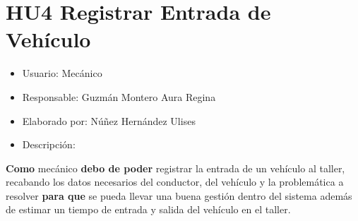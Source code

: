 \section{HU4 Registrar Entrada de Vehículo}
\begin{itemize}
	\item Usuario: Mecánico
	\item Responsable: Guzmán Montero Aura Regina
	\item Elaborado por: Núñez Hernández Ulises
	\item Descripción:\\
\end{itemize}

\textbf{Como} mecánico \textbf{debo de poder} registrar la entrada de un vehículo al taller, recabando los datos necesarios del conductor, del vehículo y la problemática a resolver \textbf{para que} se pueda llevar una buena gestión dentro del sistema además de estimar un tiempo de entrada y salida del vehículo en el taller. 